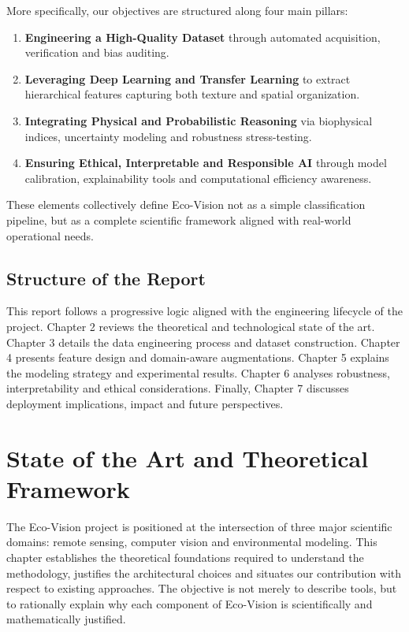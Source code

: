 \documentclass[12pt,a4paper]{report}
\begin{document}
More specifically, our objectives are structured along four main pillars:

\begin{enumerate}
\item \textbf{Engineering a High-Quality Dataset} through automated acquisition, verification and bias auditing.
\item \textbf{Leveraging Deep Learning and Transfer Learning} to extract hierarchical features capturing both texture and spatial organization.
\item \textbf{Integrating Physical and Probabilistic Reasoning} via biophysical indices, uncertainty modeling and robustness stress-testing.
\item \textbf{Ensuring Ethical, Interpretable and Responsible AI} through model calibration, explainability tools and computational efficiency awareness.
\end{enumerate}

These elements collectively define Eco-Vision not as a simple classification pipeline, but as a complete scientific framework aligned with real-world operational needs.

\section{Structure of the Report}

This report follows a progressive logic aligned with the engineering lifecycle of the project. Chapter 2 reviews the theoretical and technological state of the art. Chapter 3 details the data engineering process and dataset construction. Chapter 4 presents feature design and domain-aware augmentations. Chapter 5 explains the modeling strategy and experimental results. Chapter 6 analyses robustness, interpretability and ethical considerations. Finally, Chapter 7 discusses deployment implications, impact and future perspectives.

\newpage

\chapter{State of the Art and Theoretical Framework}

The Eco-Vision project is positioned at the intersection of three major scientific domains: remote sensing, computer vision and environmental modeling. This chapter establishes the theoretical foundations required to understand the methodology, justifies the architectural choices and situates our contribution with respect to existing approaches. The objective is not merely to describe tools, but to rationally explain why each component of Eco-Vision is scientifically and mathematically justified.
\end{document}
